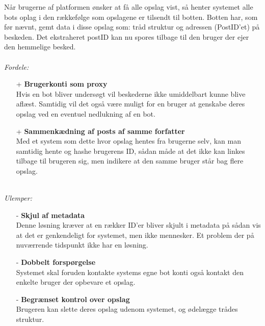 Når brugerne af platformen ønsker at få alle opslag vist, så henter systemet alle bots oplag i den rækkefølge som opslagene er tilsendt til botten. Botten har, som før nævnt, gemt data i disse opslag som: tråd struktur og adressen (PostID'et) på beskeden. Det ekstraheret postID kan nu spores tilbage til den bruger der ejer den hemmelige besked.
\\\\
\textit{Fordele:}
\begin{itemize}
    \item[+] \textbf{Brugerkonti som proxy} \hfill \\ 
    Hvis en bot bliver undersøgt vil beskederne ikke umiddelbart kunne blive aflæst. Samtidig vil det også være muligt for en bruger at genskabe deres opslag ved en eventuel nedlukning af en bot.
    \item[+] \textbf{Sammenkædning af posts af samme forfatter} \hfill \\ 
    Med et system som dette hvor opslag hentes fra brugerne selv, kan man samtidig hente og hashe brugerens ID, sådan måde at det ikke kan linkes tilbage til brugeren sig, men indikere at den samme bruger står bag flere opslag.
\end{itemize}
\\
\textit{Ulemper:}
\begin{itemize}
    \item[-] \textbf{Skjul af metadata} \hfill \\
    Denne løsning kræver at en rækker ID'er bliver skjult i metadata på sådan vis at det er genkendeligt for systemet, men ikke mennesker. Et problem der på nuværrende tidspunkt ikke har en løsning.
    \item[-] \textbf{Dobbelt forspørgelse} \hfill \\
    Systemet skal foruden kontakte systems egne bot konti også kontakt den enkelte bruger der opbevare et opslag.
    \item[-] \textbf{Begrænset kontrol over opslag} \hfill \\ 
    Brugeren kan slette deres opslag udenom systemet, og ødelægge trådes struktur.
\end{itemize}